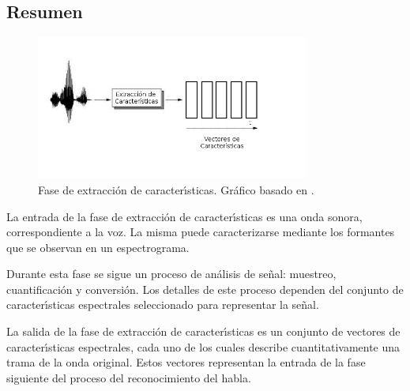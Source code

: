 \subsection{Resumen}

\begin{figure}[H] 
\centering
\includegraphics[width=0.8\textwidth]{./graphics/extraccion.png}
\caption{Fase de extracci\'on de caracter{\'\i}sticas. Gr\'afico basado en \cite{VerenichASR}.}
\label{figure:hmm}
\end{figure}

La entrada de la fase de extracci\'on de caracter{\'\i}sticas es una onda sonora, correspondiente a la voz.
La misma puede caracterizarse mediante los formantes que se observan en un espectrograma.

Durante esta fase se sigue un proceso de an\'alisis de se\~nal: muestreo, cuantificaci\'on y conversi\'on.
Los detalles de este proceso dependen del conjunto de caracter{\'\i}sticas espectrales seleccionado 
para representar la se\~nal.

La salida de la fase de extracci\'on de caracter{\'\i}sticas es un conjunto de vectores de caracter{\'\i}sticas
espectrales, cada uno de los cuales describe cuantitativamente una trama de la onda original. Estos vectores
representan la entrada de la fase siguiente del proceso del reconocimiento del habla.